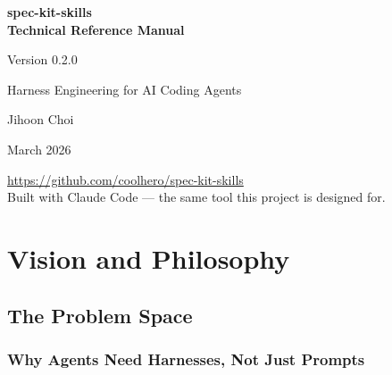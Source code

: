 \documentclass[11pt,a4paper,openright,twoside]{report}
\begin{document}
\begin{titlepage}
\centering
\vspace*{3cm}

{\Huge\bfseries\color{specblue} spec-kit-skills\\[6pt]
Technical Reference Manual}

\vspace{1.2cm}
{\Large Version 0.2.0}

\vspace{0.8cm}
{\large Harness Engineering for AI Coding Agents}

\vspace{3cm}
{\Large Jihoon Choi}

\vspace{0.5cm}
{\large March 2026}

\vfill
{\small
\url{https://github.com/coolhero/spec-kit-skills}\\[4pt]
Built with Claude Code --- the same tool this project is designed for.
}
\end{titlepage}

\tableofcontents
\listoftables

{}\setcounter{page}{1}

\part{Vision and Philosophy}

\chapter{The Problem Space}
\label{ch:problem}

\section{Why Agents Need Harnesses, Not Just Prompts}
\end{document}
